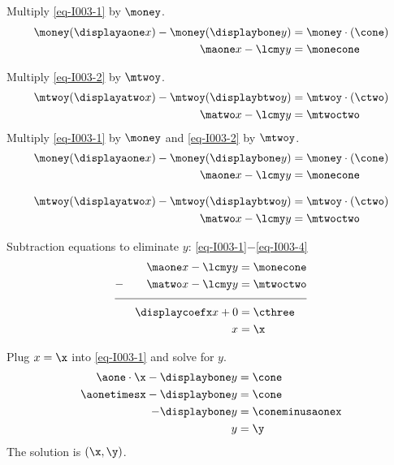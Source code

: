 \begin{solution}

\ifnum{} 
	Multiply \eqref{eq-I003-1} by $\money$.
		\begin{align}
		\money(\displayaone x) - \money(\displaybone y) &=\money\cdot(\cone) \nonumber \\
		\maone x - \lcmy y &= \monecone \label{eq-I003-3}
		\end{align}

\else 
	\ifnum{}
		Multiply \eqref{eq-I003-2} by $\mtwoy$.
		\begin{align}
		\mtwoy(\displayatwo x) - \mtwoy(\displaybtwo y) &=\mtwoy\cdot(\ctwo) \nonumber \\
		\matwo x - \lcmy y &= \mtwoctwo \label{eq-I003-4}
		\end{align}
	\else
		Multiply \eqref{eq-I003-1} by $\money$ and \eqref{eq-I003-2} by $\mtwoy$.
		\begin{align}
		\money(\displayaone x) - \money(\displaybone y) &=\money\cdot(\cone) \nonumber \\
		\maone x - \lcmy y &= \monecone \label{eq-I003-3}
		\end{align}

		\begin{align}
		\mtwoy(\displayatwo x) - \mtwoy(\displaybtwo y) &=\mtwoy\cdot(\ctwo) \nonumber \\
		\matwo x - \lcmy y &= \mtwoctwo \label{eq-I003-4}
		\end{align}

	\fi
\fi

Subtraction equations to eliminate $y$: \eqref{eq-I003-1}$-$\eqref{eq-I003-4} 
\begin{align}
&& \maone x - \lcmy y &= \monecone \nonumber \\
-&& \matwo x - \lcmy y &= \mtwoctwo  \nonumber\\[-0.5em]
\cline{1-4}
&& \displaycoefx x+0 &=\cthree \nonumber\\
&& x&=\x\nonumber
\end{align}



Plug $x=\x$ into \eqref{eq-I003-1} and solve for $y$.
\begin{align*}
\aone\cdot \x- \displaybone y &=\cone \\
\aonetimesx-\displaybone y&= \cone\\
-\displaybone y&= \coneminusaonex \\
y&=\y
\end{align*}
The solution is $(\x,\y)$. 

\end{solution}
